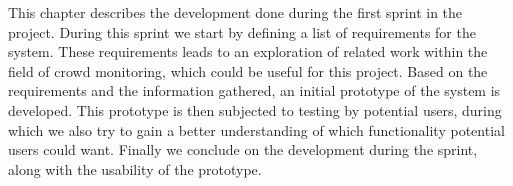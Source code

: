 This chapter describes the development done during the first sprint in the project. During this sprint we start by defining a list of requirements for the system. These requirements leads to an exploration of related work within the field of crowd monitoring, which could be useful for this project. Based on the requirements and the information gathered, an initial prototype of the system is developed. This prototype is then subjected to testing by potential users, during which we also try to gain a better understanding of which functionality potential users could want. Finally we conclude on the development during the sprint, along with the usability of the prototype.

